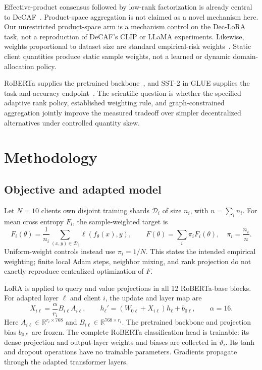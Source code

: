 \documentclass[11pt]{article}
\newcommand{\R}{\mathbb{R}}
\begin{document}
Effective-product consensus followed by low-rank factorization is already central to DeCAF~\citep{saadati2025decaf}. Product-space aggregation is not claimed as a novel mechanism here. Our unrestricted product-space arm is a mechanism control on the Dec-LoRA task, not a reproduction of DeCAF's CLIP or LLaMA experiments. Likewise, weights proportional to dataset size are standard empirical-risk weights~\citep{mcmahan2017fedavg}. Static client quantities produce static sample weights, not a learned or dynamic domain-allocation policy.

RoBERTa supplies the pretrained backbone~\citep{liu2019roberta}, and SST-2 in GLUE supplies the task and accuracy endpoint~\citep{wang2019glue}. The scientific question is whether the specified adaptive rank policy, established weighting rule, and graph-constrained aggregation jointly improve the measured tradeoff over simpler decentralized alternatives under controlled quantity skew.

\section{Methodology}
\subsection{Objective and adapted model}
Let $N=10$ clients own disjoint training shards $\mathcal D_i$ of size $n_i$, with $n=\sum_i n_i$. For mean cross entropy $F_i$, the sample-weighted target is
\begin{equation}
 F_i(\theta)=\frac1{n_i}\sum_{(x,y)\in\mathcal D_i}\ell(f_\theta(x),y),
 \qquad F(\theta)=\sum_i\pi_iF_i(\theta),\quad \pi_i=\frac{n_i}{n}.
 \label{eq:objective}
\end{equation}
Uniform-weight controls instead use $\pi_i=1/N$. This states the intended empirical weighting; finite local Adam steps, neighbor mixing, and rank projection do not exactly reproduce centralized optimization of $F$.

LoRA is applied to query and value projections in all 12 RoBERTa-base blocks. For adapted layer $\ell$ and client $i$, the update and layer map are
\begin{equation}
 X_{i\ell}=\frac{\alpha}{r_i}B_{i\ell}A_{i\ell},\qquad
 h_\ell'=\left(W_{0\ell}+X_{i\ell}\right)h_\ell+b_{0\ell},\qquad\alpha=16.
 \label{eq:model}
\end{equation}
Here $A_{i\ell}\in\R^{r_i\times768}$ and $B_{i\ell}\in\R^{768\times r_i}$. The pretrained backbone and projection bias $b_{0\ell}$ are frozen. The complete RoBERTa classification head is trainable: its dense projection and output-layer weights and biases are collected in $\vartheta_i$. Its tanh and dropout operations have no trainable parameters. Gradients propagate through the adapted transformer layers.
\end{document}
